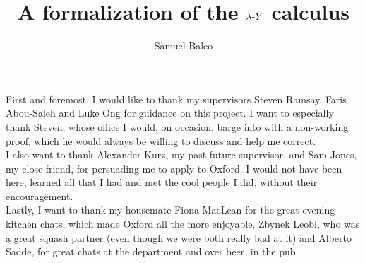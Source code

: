 \documentclass[a4paper, 12pt, twoside]{style/ociamthesis}
\title{A formalization of the \(\lambda\text{-}Y\) calculus}            %
\author{Samuel Balco}          %
\theoremstyle{plain}
\theoremstyle{definition}
\theoremstyle{remark}
\begin{document}
\maketitle
\null\newpage


\begin{acknowledgements}
First and foremost, I would like to thank my supervisors Steven Ramsay,
Faris Abou-Saleh and Luke Ong for guidance on this project. I want to
especially thank Steven, whose office I would, on occasion, barge into
with a non-working proof, which he would always be willing to discuss
and help me correct.\\
I also want to thank Alexander Kurz, my past-future supervisor, and Sam
Jones, my close friend, for persuading me to apply to Oxford. I would
not have been here, learned all that I had and met the cool people I
did, without their encouragement.\\
Lastly, I want to thank my housemate Fiona MacLean for the great evening
kitchen chats, which made Oxford all the more enjoyable, Zbynek Leobl,
who was a great squash partner (even though we were both really bad at
it) and Alberto Sadde, for great chats at the department and over beer,
in the pub.
\end{acknowledgements}
\null\newpage


\end{document}
